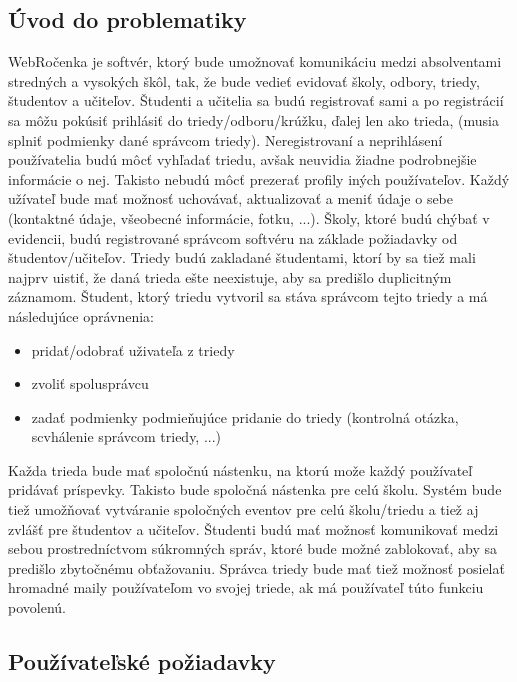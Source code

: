 \documentclass[slovak, 12pt, Times New Roman]{article}
\begin{document}
		\subsection{Úvod do problematiky}
			WebRočenka je softvér, ktorý bude umožnovať komunikáciu medzi absolventami stredných a vysokých škôl, tak, že bude vedieť evidovať školy, odbory, triedy, študentov a učiteľov. Študenti a učitelia sa budú registrovať sami a po registrácií sa môžu pokúsiť prihlásiť do triedy/odboru/krúžku, ďalej len ako trieda, (musia splniť podmienky dané správcom triedy). Neregistrovaní a neprihlásení používatelia budú môcť vyhľadať triedu, avšak neuvidia žiadne podrobnejšie informácie o nej. Takisto nebudú môcť prezerať profily iných používateľov. Každý užívateľ bude mať možnosť uchovávať, aktualizovať a meniť údaje o sebe (kontaktné údaje, všeobecné informácie, fotku, ...). Školy, ktoré budú chýbať v evidencii, budú registrované správcom softvéru na základe požiadavky od študentov/učiteľov. Triedy budú zakladané študentami, ktorí by sa tiež mali najprv uistiť, že daná trieda ešte neexistuje, aby sa predišlo duplicitným záznamom. Študent, ktorý triedu vytvoril sa stáva správcom tejto triedy a má následujúce oprávnenia:
			\begin{itemize} \itemsep0pt \parskip0pt 
				\item pridať/odobrať uživateľa z triedy
				\item zvoliť spolusprávcu
				\item zadať podmienky podmieňujúce pridanie do triedy (kontrolná otázka, scvhálenie správcom triedy, ...)
			\end{itemize}
			Každa trieda bude mať spoločnú nástenku, na ktorú može každý používateľ pridávať príspevky. Takisto bude spoločná nástenka pre celú školu. Systém bude tiež umožňovať vytváranie spoločných eventov pre celú školu/triedu a tiež aj zvlášť pre študentov a učiteľov. Študenti budú mať možnosť komunikovať medzi sebou prostredníctvom súkromných správ, ktoré bude možné zablokovať, aby sa predišlo zbytočnému obťažovaniu. Správca triedy bude mať tiež možnosť posielať hromadné maily používateľom vo svojej triede, ak má používateľ túto funkciu povolenú.
		\subsection{Používateľské požiadavky}
\end{document}
